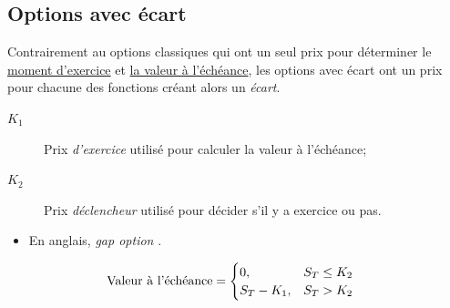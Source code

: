 \documentclass[10pt, french]{article}
\begin{document}
\begin{multicols*}{2}
\columnbreak
\subsection*{Options avec écart}
\begin{definitionNOHFILL}
Contrairement au options classiques qui ont un seul prix pour déterminer le \underline{moment d'exercice} et \underline{la valeur à l'échéance}, les options avec écart ont un prix pour chacune des fonctions créant alors un \textit{écart}.

\begin{distributions}[Notation]
\begin{description}
	\item[$K_{1}$]	Prix \textit{d'exercice} utilisé pour calculer la valeur à l'échéance;
	\item[$K_{2}$]	Prix \textit{déclencheur} utilisé pour décider s'il y a exercice ou pas.
\end{description}
\end{distributions}

\tcbline

\begin{itemize}[leftmargin = *]
	\item	En anglais, \og \textit{gap option} \fg{}.
\end{itemize}
\end{definitionNOHFILL}

\begin{definitionNOHFILLsub}
\begin{align*}
	\shortstack{Valeur à l'échéance}
	&=	\begin{cases}
		0,	&	S_{T}	\leq		K_{2}	\\
		S_{T}	-	K_{1},	&	S_{T}	>		K_{2}	\\
		\end{cases}
\end{align*}

\begin{center}	

\end{center}
\end{definitionNOHFILLsub}
\end{multicols*}
\end{document}
